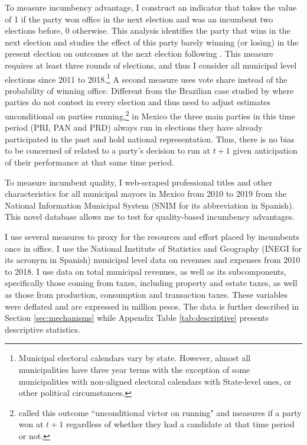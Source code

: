 \documentclass[12pt]{amsart}
\makeatletter
\def\subsection{\@startsection{subsection}{2}
	\z@{.8\linespacing\@plus.7\linespacing}{.7\linespacing}{\large}}
\numberwithin{equation}{section}
\theoremstyle{definition}
\theoremstyle{definition}
\theoremstyle{definition}
\makeatother
\begin{document}
\subsection{Data}   

To measure incumbency advantage, I construct an indicator that takes the value of 1 if the party won office in the next election and was an incumbent two elections before, 0 otherwise. This analysis identifies the party that wins in the next election and studies the effect of this party barely winning (or losing) in the present election on outcomes at the next election following \citet{klasnja_titiunik_2017}. This measure requires at least three rounds of elections, and thus I consider all municipal level elections since 2011 to 2018.\footnote{Municipal electoral calendars vary by state. However, almost all municipalities have three year terms with the exception of some municipalities with non-aligned electoral calendars with State-level ones, or other political circumstances.} A second measure uses vote share instead of the probability of winning office. Different from the Brazilian case studied by \citet{klasnja_titiunik_2017} where parties do not contest in every election and thus need to adjust estimates unconditional on parties running,\footnote{\citet{klasnja_titiunik_2017} called this outcome ``unconditional victor on running" and measures if a party won at $t+1$ regardless of whether they had a candidate at that time period or not.} in Mexico the three main parties in this time period (PRI, PAN and PRD) always run in elections they have already participated in the past and hold national representation. Thus, there is no bias to be concerned of related to a party's decision to run at $t+1$ given anticipation of their performance at that same time period.  

To measure incumbent quality, I web-scraped professional titles and other characteristics for all municipal mayors in Mexico from 2010 to 2019 from the National Information Municipal System (SNIM for its abbreviation in Spanish). This novel database allows me to test for quality-based incumbency advantages.

I use several measures to proxy for the resources and effort placed by incumbents once in office. I use the National Institute of Statistics and Geography (INEGI for its acronym in Spanish) municipal level data on revenues and expenses from 2010 to 2018. I use data on total municipal revenues, as well as its subcomponents, specifically those coming from taxes, including property and estate taxes, as well as those from production, consumption and transaction taxes. These variables were deflated and are expressed in million pesos. The data is further described in Section \ref{sec:mechanisms} while Appendix Table \ref{tab:descriptive} presents descriptive statistics.
\end{document}
